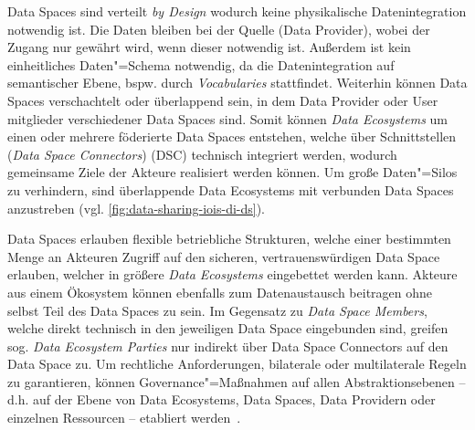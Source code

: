 Data Spaces sind verteilt \emph{by Design} wodurch keine physikalische Datenintegration notwendig ist.
Die Daten bleiben bei der Quelle (Data Provider), wobei der Zugang nur gewährt wird, wenn dieser notwendig ist.
Außerdem ist kein einheitliches Daten"=Schema notwendig, da die Datenintegration auf semantischer Ebene, bspw. durch \emph{Vocabularies} stattfindet.
Weiterhin können Data Spaces verschachtelt oder überlappend sein, in dem Data Provider oder User mitglieder verschiedener Data Spaces sind.
Somit können \emph{Data Ecosystems} um einen oder mehrere föderierte Data Spaces entstehen, welche über Schnittstellen (\emph{Data Space Connectors}) (DSC) technisch integriert werden, wodurch gemeinsame Ziele der Akteure realisiert werden können.
Um große Daten"=Silos zu verhindern, sind überlappende Data Ecosystems mit verbunden Data Spaces anzustreben (vgl. \autoref{fig:data-sharing-iois-di-ds}).

Data Spaces erlauben flexible betriebliche Strukturen, welche einer bestimmten Menge an Akteuren Zugriff auf den sicheren, vertrauenswürdigen Data Space erlauben, welcher in größere \emph{Data Ecosystems} eingebettet werden kann.
Akteure aus einem Ökosystem können ebenfalls zum Datenaustausch beitragen ohne selbst Teil des Data Spaces zu sein.
Im Gegensatz zu \emph{Data Space Members}, welche direkt technisch in den jeweiligen Data Space eingebunden sind, greifen sog. \emph{Data Ecosystem Parties} nur indirekt über Data Space Connectors auf den Data Space zu.
Um rechtliche Anforderungen, bilaterale oder multilaterale Regeln zu garantieren, können Governance"=Maßnahmen auf allen Abstraktionsebenen -- d.h. auf der Ebene von Data Ecosystems, Data Spaces, Data Providern oder einzelnen Ressourcen -- etabliert werden~\cite{mollerIndustrialDataEcosystems2024}.

